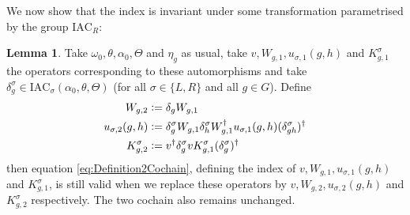 \documentclass[12pt,a4paper,twoside]{article}
\newcommand{\IAC}{\textrm{IAC}}
\newcommand{\defeq}{\vcentcolon=}
\theoremstyle{definition}
\newtheorem{lemma}[theorem]{Lemma}
\numberwithin{equation}{section}
\begin{document}
We now show that the index is invariant under some transformation parametrised by the group $\IAC_R$:
\begin{lemma}\label{lem:TransformationUnderDelta}
	Take $\omega_0,\theta,\alpha_0,\Theta$ and $\eta_g$ as usual, take $v,W_{g,1},u_{\sigma,1}(g,h)$ and $K_{g,1}^\sigma$ the operators corresponding to these automorphisms and take $\delta^\sigma_g\in\IAC_\sigma(\alpha_0,\theta,\Theta)$ (for all $\sigma\in\{L,R\}$ and all $g\in G$). Define
	\begin{align}
		W_{g,2}&\defeq\delta_g W_{g,1}\\
		u_{\sigma,2}(g,h)&\defeq \delta_g^\sigma W_{g,1}\delta_h^\sigma W_{g,1}^\dagger u_{\sigma,1}(g,h)(\delta_{gh}^\sigma)^\dagger\\
		K^\sigma_{g,2}&\defeq v^\dagger \delta_g^\sigma v K_{g,1}^\sigma (\delta_g^\sigma)^\dagger
	\end{align}
	then equation \eqref{eq:Definition2Cochain}, defining the index of $v,W_{g,1},u_{\sigma,1}(g,h)$ and $K_{g,1}^\sigma$, is still valid when we replace these operators by $v,W_{g,2},u_{\sigma,2}(g,h)$ and $K_{g,2}^\sigma$ respectively. The two cochain also remains unchanged.
\end{lemma}
\end{document}

